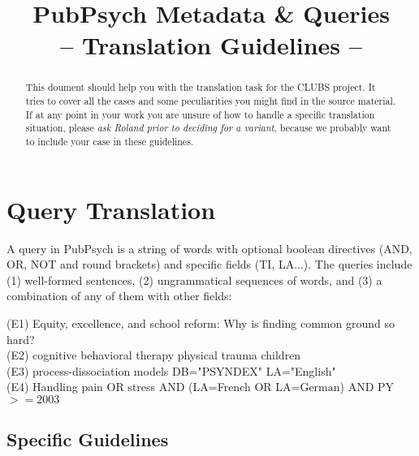 \documentclass[a4paper,10pt]{article}
\title{PubPsych Metadata \& Queries \\ -- Translation Guidelines --}
\author{}
\newcommand{\exTit}[1]{\begin{tcolorbox}[enhanced,attach boxed title to top center={yshift=-3mm,yshifttext=-1mm},title=Examples,coltitle=black,colbacktitle=white]{#1}\end{tcolorbox}}
\begin{document}
\maketitle

 \begin{abstract}
 	This doument should help you with the translation task for the CLUBS project. It tries to cover all the cases and some peculiarities you might find in the source material. If at any point in your work you are unsure of how to handle a specific translation situation, please \emph{ask Roland prior to deciding for a variant}, because we probably want to include your case in these guidelines. 
 \end{abstract}

\section{Query Translation}
\label{s:queries}
A query in PubPsych is a string of words with optional boolean directives (AND, OR, NOT and round brackets) and specific fields (TI, LA...). 
The queries include (1) well-formed sentences, (2) ungrammatical sequences of words, and (3) a combination of any of them with other fields:


\medskip
\exTit{(E1) Equity, excellence, and school reform: Why is finding common ground so hard? \\
(E2) cognitive behavioral therapy physical trauma children \\
(E3) process-dissociation models DB="PSYNDEX" LA="English" \\
(E4) Handling pain OR stress AND (LA=French OR LA=German) AND PY$>=2003$}



\subsection{Specific Guidelines}
\label{ss:q_guidelines}
\end{document}
